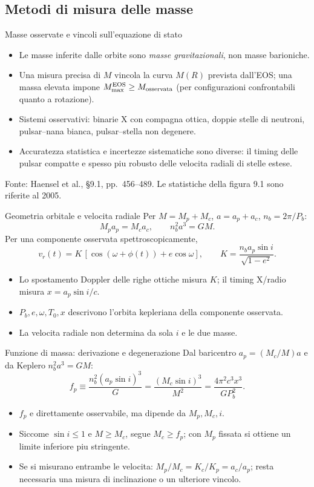 \subsection{Metodi di misura delle masse}

\begin{frame}[t]{Masse osservate e vincoli sull'equazione di stato}
\small
\begin{itemize}
\item Le masse inferite dalle orbite sono \emph{masse gravitazionali}, non masse barioniche.
\item Una misura precisa di $M$ vincola la curva $M(R)$ prevista dall'EOS; una massa elevata impone $M_{\max}^{\rm EOS}\geq M_{\rm osservata}$ (per configurazioni confrontabili quanto a rotazione).
\item Sistemi osservativi: binarie X con compagna ottica, doppie stelle di neutroni, pulsar--nana bianca, pulsar--stella non degenere.
\item Accuratezza statistica e incertezze sistematiche sono diverse: il timing delle pulsar compatte e spesso piu robusto delle velocita radiali di stelle estese.
\end{itemize}
\medskip\footnotesize Fonte: Haensel et al., \S9.1, pp.~456--489. Le statistiche della figura 9.1 sono riferite al 2005.
\end{frame}

\begin{frame}[t]{Geometria orbitale e velocita radiale}
\small
Per $M=M_p+M_c$, $a=a_p+a_c$, $n_b=2\pi/P_b$:
\[
M_pa_p=M_ca_c,\qquad n_b^2a^3=GM.
\]
Per una componente osservata spettroscopicamente,
\[
v_r(t)=K\,[\cos(\omega+\phi(t))+e\cos\omega],\qquad
K=\frac{n_ba_p\sin i}{\sqrt{1-e^2}}.
\]
\begin{itemize}
\item Lo spostamento Doppler delle righe ottiche misura $K$; il timing X/radio misura $x=a_p\sin i/c$.
\item $P_b,e,\omega,T_0,x$ descrivono l'orbita kepleriana della componente osservata.
\item La velocita radiale non determina da sola $i$ e le due masse.
\end{itemize}
\end{frame}

\begin{frame}[t]{Funzione di massa: derivazione e degenerazione}
\small
Dal baricentro $a_p=(M_c/M)a$ e da Keplero $n_b^2a^3=GM$:
\[
f_p\equiv\frac{n_b^2(a_p\sin i)^3}{G}
=\frac{(M_c\sin i)^3}{M^2}
=\frac{4\pi^2c^3x^3}{GP_b^2}.
\]
\begin{itemize}
\item $f_p$ e direttamente osservabile, ma dipende da $M_p,M_c,i$.
\item Siccome $\sin i\leq1$ e $M\geq M_c$, segue $M_c\geq f_p$; con $M_p$ fissata si ottiene un limite inferiore piu stringente.
\item Se si misurano entrambe le velocita: $M_p/M_c=K_c/K_p=a_c/a_p$; resta necessaria una misura di inclinazione o un ulteriore vincolo.
\end{itemize}
\end{frame}

